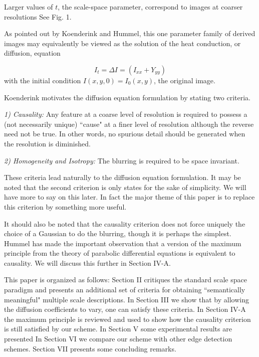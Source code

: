 \documentclass[10pt,letterpaper]{article}
\begin{document}
	Larger values of $t$, the scale-space parameter, correspond to images at coarser resolutions See Fig. 1.
	
	As pointed out by Koenderink and Hummel, this one parameter family of derived images may equivalently be viewed as the solution of the heat conduction, or diffusion, equation
	
	\begin{equation}
		I_t= \Delta I=(I_{xx}+Y_{yy})
	\end{equation}
	with the initial condition $I(x,y,0)=I_0(x,y)$, the original image.
	
	Koenderink motivates the diffusion equation formulation by stating two criteria.
	
	\emph{1) Causality:} Any feature at a coarse level of resolution is required to possess a (not necessarily unique) ``cause" at a finer level of resolution although the reverse need not be true. In other words, no spurious detail should be generated when the resolution is diminished.
	
	\emph{2) Homogeneity and Isotropy:} The blurring is required to be space invariant.
	
	These criteria lead naturally to the diffusion equation formulation. It may be noted that the second criterion is only states for the sake of simplicity. We will have more to say on this later. In fact the major theme of this paper is to replace this criterion by something more useful.
	
	It should also be noted that the causality criterion does not force uniquely the choice of a Gaussian to do the blurring, though it is perhaps the simplest. Hummel \cite{hummel1986representations} has made the important observation that a version of the maximum principle from the theory of parabolic differential equations is equivalent to causality. We will discuss this further in Section IV-A.
	
	This paper is organized as follows: Section II critiques the standard scale space paradigm and presents an additional set of criteria for obtaining ``semantically meaningful" multiple scale descriptions. In Section III we show that by allowing the diffusion coefficients to vary, one can satisfy these criteria. In Section IV-A the maximum principle is reviewed and used to show how the causality criterion is still satisfied by our scheme. In Section V some experimental results are presented In Section VI we compare our scheme with other edge detection schemes. Section VII presents some concluding remarks.
	
\end{document}
